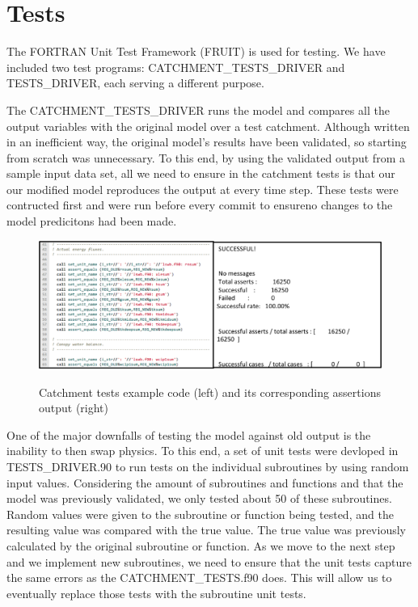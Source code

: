 \documentclass[pdftex,12pt,a4paper]{article}
\begin{document}
\section{Tests}

The FORTRAN Unit Test Framework (FRUIT) is used for testing. We have included two test programs: CATCHMENT\_TESTS\_DRIVER and TESTS\_DRIVER, each serving a different purpose.

The CATCHMENT\_TESTS\_DRIVER runs the model and compares all the output variables with the original model over a test catchment. Although written in an inefficient way, the original model's results have been validated, so starting from scratch was unnecessary. To this end, by using the validated output from a sample input data set, all we need to ensure in the catchment tests is that our our modified model reproduces the output at every time step. These tests were contructed first and were run before every commit to ensureno changes to the model predicitons had been made. 

\begin{figure}[h]
	\centering
	\includegraphics[width=5.5in]{Figures/Tests1.png}
	\label{Tests1}
	\caption{Catchment tests example code (left) and its corresponding assertions output (right)}
\end{figure}

One of the major downfalls of testing the model against old output is the inability to then swap physics. To this end, a set of unit tests were devloped in TESTS\_DRIVER.90 to run tests on the individual subroutines by using random input values.  Considering the amount of subroutines and functions and that the model was previously validated, we only tested about 50 of these subroutines. Random values were given to the subroutine or function being tested, and the resulting value was compared with the true value. The true value was previously calculated by the original subroutine or function. As we move to the next step and we implement new subroutines, we need to ensure that the unit tests capture the same errors as the CATCHMENT\_TESTS.f90 does. This will allow us to eventually replace those tests with the subroutine unit tests.
\end{document}
